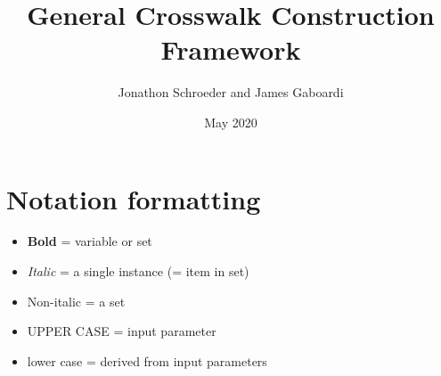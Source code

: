\documentclass{article}
\title{General Crosswalk Construction Framework}
\author{Jonathon Schroeder and James Gaboardi}
\date{May 2020}
\begin{document}
\maketitle

\section{Notation formatting}
\begin{itemize}
  \item {\bf Bold} = variable or set
  \item \textit{Italic} = a single instance (= item in set)
  \item Non-italic = a set
  \item UPPER CASE = input parameter
  \item lower case = derived from input parameters
\end{itemize}
\end{document}
